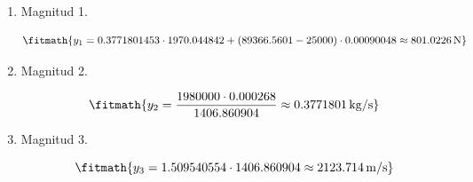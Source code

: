 \begin{enumerate}

\item Magnitud 1.

\[\fitmath{y_{1}=0.3771801453\cdot 1970.044842+\left(89366.5601-25000\right)\cdot 0.00090048\approx 801.0226\,\mathrm{N}}\]

\item Magnitud 2.

\[\fitmath{y_{2}=\frac{1980000\cdot 0.000268}{1406.860904}\approx 0.3771801\,\mathrm{kg/s}}\]

\item Magnitud 3.

\[\fitmath{y_{3}=1.509540554\cdot 1406.860904\approx 2123.714\,\mathrm{m/s}}\]

\end{enumerate}
